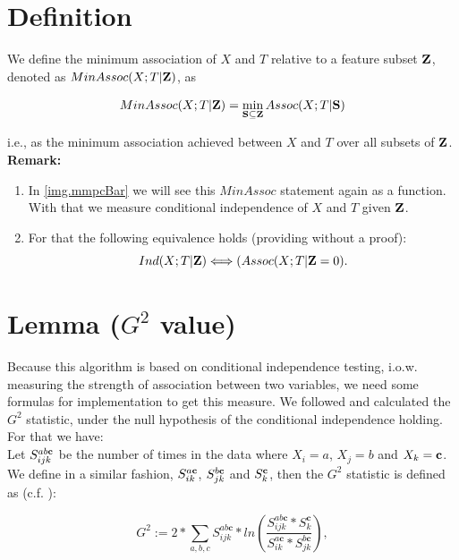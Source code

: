 	\section*{Definition} \label{s.Def9}

		We define the minimum association of $X$ and $T$ relative to a feature subset ${\textbf{Z}}$, denoted as $MinAssoc(X; T | {\textbf{Z}})$, as

		\begin{equation}
			MinAssoc (X; T | {\textbf{Z}}) = \min_{{\textbf{S}} \subseteq {\textbf{Z}}} Assoc(X; T | {\textbf{S}})
		\end{equation}

		i.e., as the minimum association achieved between $X$ and $T$ over all subsets of ${\textbf{Z}}$. \\
		\textbf{Remark:}
		\begin{enumerate}
			\item In \autoref{img.mmpcBar} we will see this $MinAssoc$ statement again as a function. With that we measure conditional independence of $X$ and $T$ given ${\textbf{Z}}$.
			\item For that the following equivalence holds (providing without a proof): 
				\begin{equation}
					Ind(X; T | {\textbf{Z}}) \Longleftrightarrow (Assoc(X; T | {\textbf{Z}} = 0).
				\end{equation}
		\end{enumerate}

	\section*{Lemma ($G^{2}$ value)} \label{s.g2}

		Because this algorithm is based on conditional independence testing, i.o.w. measuring the strength of association between two variables, we need some formulas for implementation to get this measure. We followed \cite{SGSN} and calculated the $G^{2}$ statistic, under the null hypothesis of the conditional independence holding. For that we have:\\
		Let $S_{ijk}^{ab{\textbf{c}}}$ be the number of times in the data where $X_{i} = a$, $X_{j} = b$ and $X_{k} = {\textbf{c}}$. We define in a similar fashion, $S_{ik}^{a{\textbf{c}}}$, $S_{jk}^{b{\textbf{c}}}$  and $S_{k}^{{\textbf{c}}}$, then the $G^{2}$ statistic is defined as (c.f. \cite{SGSN}):

		\begin{equation}
			G^{2} := 2 * \sum_{a,b,c} S^{ab\textbf{c}}_{ijk} * ln \left( \frac{S^{ab\textbf{c}}_{ijk}*S^{\textbf{c}}_{k}}{S^{a\textbf{c}}_{ik}*S^{b\textbf{c}}_{jk}} \right),
		\end{equation}


